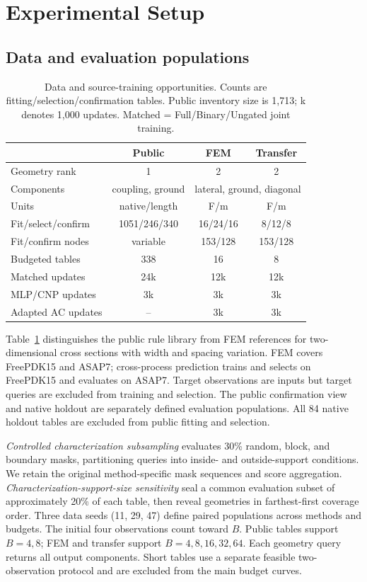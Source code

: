 \documentclass[conference,9pt,letterpaper]{IEEEtran}
\begin{document}
\section{Experimental Setup}
\subsection{Data and evaluation populations}
\begin{table}[t]
\centering\caption{Data and source-training opportunities. Counts are fitting/selection/confirmation tables. Public inventory size is 1,713; k denotes 1,000 updates. Matched = Full/Binary/Ungated joint training.}
\label{tab:data}
\small\setlength{\tabcolsep}{3pt}
\begin{tabular}{lccc}\toprule
 & Public & FEM & Transfer\\\midrule
Geometry rank & 1 & 2 & 2\\
Components & coupling, ground & \multicolumn{2}{c}{lateral, ground, diagonal}\\
Units & native/length & F/m & F/m\\
Fit/select/confirm & 1051/246/340 & 16/24/16 & 8/12/8\\
Fit/confirm nodes & variable & 153/128 & 153/128\\
Budgeted tables & 338 & 16 & 8\\
Matched updates & 24k & 12k & 12k\\
MLP/CNP updates & 3k & 3k & 3k\\
Adapted AC updates & -- & 3k & 3k\\\bottomrule
\end{tabular}
\end{table}
Table~\ref{tab:data} distinguishes the public rule library from FEM references for two-dimensional cross sections with width and spacing variation. FEM covers FreePDK15 and ASAP7; cross-process prediction trains and selects on FreePDK15 and evaluates on ASAP7. Target observations are inputs but target queries are excluded from training and selection. The public confirmation view and native holdout are separately defined evaluation populations. All 84 native holdout tables are excluded from public fitting and selection.

\emph{Controlled characterization subsampling} evaluates 30\% random, block, and boundary masks, partitioning queries into inside- and outside-support conditions. We retain the original method-specific mask sequences and score aggregation. \emph{Characterization-support-size sensitivity} seal a common evaluation subset of approximately 20\% of each table, then reveal geometries in farthest-first coverage order. Three data seeds (11, 29, 47) define paired populations across methods and budgets. The initial four observations count toward $B$. Public tables support $B=4,8$; FEM and transfer support $B=4,8,16,32,64$. Each geometry query returns all output components. Short tables use a separate feasible two-observation protocol and are excluded from the main budget curves.
\end{document}
